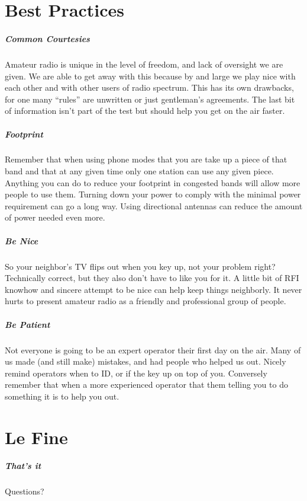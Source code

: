 \documentclass[10pt]{beamer}
\begin{document}
\part{Best Practices}

\begin{frame}
\frametitle{Common Courtesies}
Amateur radio is unique in the level of freedom, and lack of oversight we are given. We are able to get away with this because by and large we play nice with each other and with other users of radio spectrum. This has its own drawbacks, for one many ``rules'' are unwritten or just gentleman's agreements. The last bit of information isn't part of the test but should help you get on the air faster.
\end{frame}

\begin{frame}
\frametitle{Footprint}
Remember that when using phone modes that you are take up a piece of that band and that at any given time only one station can use any given piece. Anything you can do to reduce your footprint in congested bands will allow more people to use them. Turning down your power to comply with the minimal power requirement can go a long way. Using directional antennas can reduce the amount of power needed even more.
\end{frame}

\begin{frame}
\frametitle{Be Nice}
So your neighbor's TV flips out when you key up, not your problem right? Technically correct, but they also don't have to like you for it. A little bit of RFI knowhow and sincere attempt to be nice can help keep things neighborly. It never hurts to present amateur radio as a friendly and professional group of people.
\end{frame}

\begin{frame}
\frametitle{Be Patient}
Not everyone is going to be an expert operator their first day on the air. Many of us made (and still make) mistakes, and had people who helped us out. Nicely remind operators when to ID, or if the key up on top of you. Conversely remember that when a more experienced operator that them telling you to do something it is to help you out.
\end{frame}

\part{Le Fine}

\begin{frame}
\frametitle{That's it}
Questions?
\end{frame}

%
%
\end{document}
